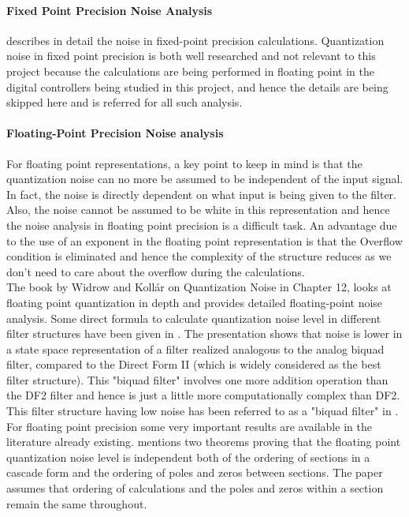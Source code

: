 \documentclass[a4paper,12pt]{article}
\begin{document}
	\paragraph{Fixed Point Precision Noise Analysis}
	\cite{Oppenheim} describes in detail the noise in fixed-point precision calculations. Quantization noise in fixed point precision is both well researched and not relevant to this project because the calculations are being performed in floating point in the digital controllers being studied in this project, and hence the details are being skipped here and \cite{Oppenheim} is referred for all such analysis.
	\paragraph{Floating-Point Precision Noise analysis}
For floating point representations, a key point to keep in mind is that the quantization noise can no more be assumed to be independent of the input signal. In fact, the noise is directly dependent on what input is being given to the filter. Also, the noise cannot be assumed to be white in this representation and hence the noise analysis in floating point precision is a difficult task. An advantage due to the use of an exponent in the floating point representation is that the Overflow condition is eliminated and hence the complexity of the structure reduces as we don't need to care about the overflow during the calculations.\\
The book by Widrow and Koll\'ar on Quantization Noise in Chapter 12, \cite{Kollar} looks at floating point quantization in depth and provides detailed floating-point noise analysis. Some direct formula to calculate quantization noise level in different filter structures have been given in \cite{Matts}. The presentation \cite{Matts} shows that noise is lower in a state space representation of a filter realized analogous to the analog biquad filter, compared to the Direct Form II  (which is widely considered as the best filter structure). This "biquad filter" involves one more addition operation than the DF2 filter and hence is just a little more computationally complex than DF2. This filter structure having low noise has been referred to as a "biquad filter" in \cite{Matts}.
For floating point precision some very important results are available in the literature already existing. \cite{Zeng} mentions two theorems proving that the floating point quantization noise level is independent both of the ordering of sections in a cascade form and the ordering of poles and zeros between sections. The paper assumes that ordering of calculations and the poles and zeros within a section remain the same throughout.
\end{document}
